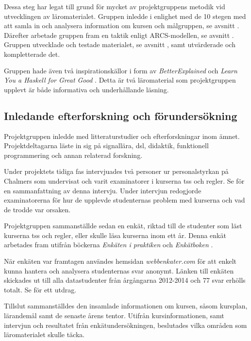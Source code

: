 \documentclass[12pt,a4paper,twoside,openright]{article}
\begin{document}
Dessa steg har legat till grund för mycket av projektgruppens metodik
vid utvecklingen av läromaterialet. Gruppen inledde i enlighet med de
10 stegen med att samla in och analysera information om kursen och
målgruppen, se avsnitt . Därefter
arbetade gruppen fram en taktik enligt ARCS-modellen, se avsnitt
. Gruppen utvecklade och testade materialet,
se avsnitt , samt utvärderade och kompletterade
det.

Gruppen hade även två inspirationskällor i form av
\textit{BetterExplained} \cite{betterexplained} och \textit{Learn You
  a Haskell for Great Good} \cite{learnyouahaskell}. Detta är två
läromaterial som projektgruppen upplevt är både informativa och
underhållande läsning.

\subsection{Inledande efterforskning och förundersökning}
\label{sec:efterforskning}

Projektgruppen inledde med litteraturstudier och efterforskningar inom
ämnet. Projektdeltagarna läste in sig på signallära, \gls{dsl},
didaktik, funktionell programmering och annan relaterad forskning.

Under projektets tidiga fas intervjuades två personer ur
personalstyrkan på Chalmers som undervisat och varit examinatorer i
kurserna \acrlong{tss} och \gls{regler}. Se
 för en sammanfattning av denna
intervju. Under intervjun redogjorde examinatorerna för hur de
upplevde studenternas problem med kurserna och vad de trodde var
orsaken.

Projektgruppen sammanställde sedan en enkät, riktad till de studenter
som läst kurs\-erna \acrlong{tss} och \gls{regler}, eller skulle läsa
kurserna inom ett år. Denna enkät arbetades fram utifrån böckerna
\textit{Enkäten i praktiken} \cite{enkaten_i_praktiken} och
\textit{Enkätboken} \cite{enkatboken}.

När enkäten var framtagen användes hemsidan \textit{webbenkater.com}
för att enkelt kunna hantera och analysera studenternas svar anonymt.
Länken till enkäten skickades ut till alla datastudenter från
årgångarna 2012-2014 och 77 svar erhölls totalt. Se
 för ett utdrag.

Tillslut sammanställdes den insamlade informationen om
kursen, såsom kursplan, lärandemål samt de senaste årens
tentor. Utifrån kursinformationen, samt intervjun och resultatet från
enkätundersökningen, beslutades vilka områden som läromaterialet
skulle täcka.
\end{document}
